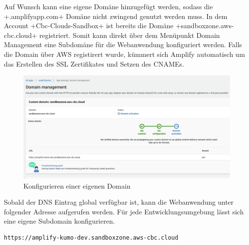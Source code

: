Auf Wunsch kann eine eigene Domäne hinzugefügt werden, sodass die \spverb+.amplifyapp.com+ Domäne nicht zwingend genutzt werden muss.
In dem Account \spverb+Cbc-Clouds-Sandbox+ ist bereits die Domäne \spverb+sandboxzone.aws-cbc.cloud+ registriert.
Somit kann direkt über dem Menüpunkt \glqq Domain Management\grqq{} eine Subdomäne für die Webanwendung konfiguriert werden.
Falls die Domain über AWS registirert wurde, kümmert sich Amplify automatisch um das Erstellen des SSL Zertifikates und Setzen des CNAMEs.

\begin{figure}[htbp]
    \centering
    \includegraphics[width=1.0\textwidth]{50-Implementierung/SSL.png}
    \caption{Konfigurieren einer eigenen Domain}
    \label{fig:meine-grafik}
\end{figure}

Sobald der DNS Eintrag global verfügbar ist, kann die Webanwendung unter folgender Adresse aufgerufen werden.
Für jede Entwicklungsumgebung lässt sich eine eigene Subdomain konfigurieren.
\\
\begin{lstlisting}[basicstyle=\ttfamily\small, breaklines=true , frame = single, backgroundcolor=\color{flashwhite} ]
https://amplify-kumo-dev.sandboxzone.aws-cbc.cloud
\end{lstlisting}
